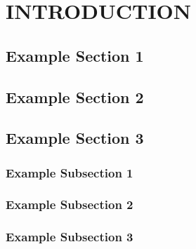 \documentclass[12pt,a4paper]{report}
\begin{document}
	
	
	
	
	
	
	
	
	
	\let\cleardoublepage\clearpage


	\chapter{INTRODUCTION}


	\section{Example Section 1}
	\blindtext[2]
	\blindtext[2]
	\section{Example Section 2}
	\blindtext[5]
	\section{Example Section 3}
	\subsection{Example Subsection 1}
	\blindtext[5]
	\subsection{Example Subsection 2}
	\blindtext[5]
	\subsection{Example Subsection 3}
	\blindtext[5]
\end{document}
